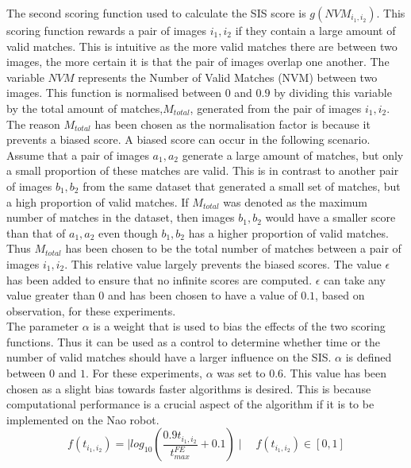\documentclass[11pt]{report}
\begin{document}
The second scoring function used to calculate the SIS score is $g(NVM_{i_1, i_2})$. This scoring function rewards a pair of images $i_1, i_2$ if they contain a large amount of valid matches. This is intuitive as the more valid matches there are between two images, the more certain it is that the pair of images overlap one another. The variable $NVM$ represents the Number of Valid Matches (NVM) between two images. This function is normalised between $0$ and  $0.9$ by dividing this variable by the total amount of matches,$M_{total}$, generated from the pair of images $i_1, i_2$. The reason $M_{total}$ has been chosen as the normalisation factor is because it prevents a biased score. A biased score can occur in the following scenario. Assume that a pair of images $a_1, a_2$ generate a large amount of matches, but only a small proportion of these matches are valid. This is in contrast to another pair of images $b_1, b_2$ from the same dataset that generated a small set of matches, but a high proportion of valid matches. If $M_{total}$ was denoted as the maximum number of matches in the dataset, then images $b_1, b_2$ would have a smaller score than that of $a_1, a_2$ even though $b_1, b_2$ has a higher proportion of valid matches. Thus $M_{total}$ has been chosen to be the total number of matches between a pair of images $i_1, i_2$. This relative value largely prevents the biased scores. The value $\epsilon$ has been added to ensure that no infinite scores are computed. $\epsilon$ can take any value greater than $0$ and has been chosen to have a value of $0.1$, based on observation, for these experiments.\\ 

The parameter $\alpha$ is a weight that is used to bias the effects of the two scoring functions. Thus it can be used as a control to determine whether time or the number of valid matches should have a larger influence on the SIS. $\alpha$ is defined between $0$ and $1$. For these experiments, $\alpha$ was set to $0.6$. This value has been chosen as a slight bias towards faster algorithms is desired. This is because computational performance is a crucial aspect of the algorithm if it is to be implemented on the Nao robot.\\

\begin{equation}
f(t_{i_1, i_2}) = \mid log_{10}(\frac{0.9 t_{i_1, i_2}}{t_{max}^{FE}} + 0.1) \mid \quad f(t_{i_1, i_2})\in [0, 1]
\label{eqn:time}
\end{equation}
\end{document}
